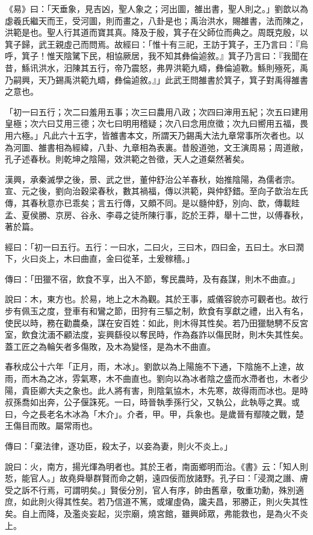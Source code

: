 
\begin{pinyinscope}
《易》曰：「天垂象，見吉凶，聖人象之；河出圖，雒出書，聖人則之。」劉歆以為虙羲氏繼天而王，受河圖，則而畫之，八卦是也；禹治洪水，賜雒書，法而陳之，洪範是也。聖人行其道而寶其真。降及于殷，箕子在父師位而典之。周既克殷，以箕子歸，武王親虛己而問焉。故經曰：「惟十有三祀，王訪于箕子，王乃言曰：『烏呼，箕子！惟天陰騭下民，相協厥居，我不知其彝倫逌敘。』箕子乃言曰：『我聞在昔，鯀讯洪水，汨陳其五行，帝乃震怒，弗畀洪範九疇，彝倫逌斁。鯀則殛死，禹乃嗣興，天乃錫禹洪範九疇，彝倫逌敘。』」此武王問雒書於箕子，箕子對禹得雒書之意也。

「初一曰五行；次二曰羞用五事；次三曰農用八政；次四曰渖用五紀；次五曰建用皇極；次六曰艾用三德；次七曰明用稽疑；次八曰念用庶徵；次九曰嚮用五福，畏用六極。」凡此六十五字，皆雒書本文，所謂天乃錫禹大法九章常事所次者也。以為河圖、雒書相為經緯，八卦、九章相為表裏。昔殷道弛，文王演周易；周道敝，孔子述春秋。則乾坤之陰陽，效洪範之咎徵，天人之道粲然著矣。

漢興，承秦滅學之後，景、武之世，董仲舒治公羊春秋，始推陰陽，為儒者宗。宣、元之後，劉向治穀梁春秋，數其禍福，傳以洪範，與仲舒錯。至向子歆治左氏傳，其春秋意亦已乖矣；言五行傳，又頗不同。是以髓仲舒，別向、歆，傳載眭孟、夏侯勝、京房、谷永、李尋之徒所陳行事，訖於王莽，舉十二世，以傅春秋，著於篇。

經曰：「初一曰五行。五行：一曰水，二曰火，三曰木，四曰金，五曰土。水曰潤下，火曰炎上，木曰曲直，金曰從革，土爰稼穡。」

傳曰：「田獵不宿，飲食不享，出入不節，奪民農時，及有姦謀，則木不曲直。」

說曰：木，東方也。於易，地上之木為觀。其於王事，威儀容貌亦可觀者也。故行步有佩玉之度，登車有和鸞之節，田狩有三驅之制，飲食有享獻之禮，出入有名，使民以時，務在勸農桑，謀在安百姓：如此，則木得其性矣。若乃田獵馳騁不反宮室，飲食沈湎不顧法度，妄興繇役以奪民時，作為姦詐以傷民財，則木失其性矣。蓋工匠之為輪矢者多傷敗，及木為變怪，是為木不曲直。

春秋成公十六年「正月，雨，木冰」。劉歆以為上陽施不下通，下陰施不上達，故雨，而木為之冰，雰氣寒，木不曲直也。劉向以為冰者陰之盛而水滯者也，木者少陽，貴臣卿大夫之象也。此人將有害，則陰氣協木，木先寒，故得雨而冰也。是時叔孫喬如出奔，公子偃誅死。一曰，時晉執季孫行父，又執公，此執辱之異。或曰，今之長老名木冰為「木介」。介者，甲。甲，兵象也。是歲晉有鄢陵之戰，楚王傷目而敗。屬常雨也。

傳曰：「棄法律，逐功臣，殺太子，以妾為妻，則火不炎上。」

說曰：火，南方，揚光煇為明者也。其於王者，南面鄉明而治。《書》云：「知人則悊，能官人。」故堯舜舉群賢而命之朝，遠四佞而放諸野。孔子曰：「浸潤之譖、膚受之訴不行焉，可謂明矣。」賢佞分別，官人有序，帥由舊章，敬重功勳，殊別適庶，如此則火得其性矣。若乃信道不篤，或燿虛偽，讒夫昌，邪勝正，則火失其性矣。自上而降，及濫炎妄起，災宗廟，燒宮館，雖興師眾，弗能救也，是為火不炎上。


\end{pinyinscope}
